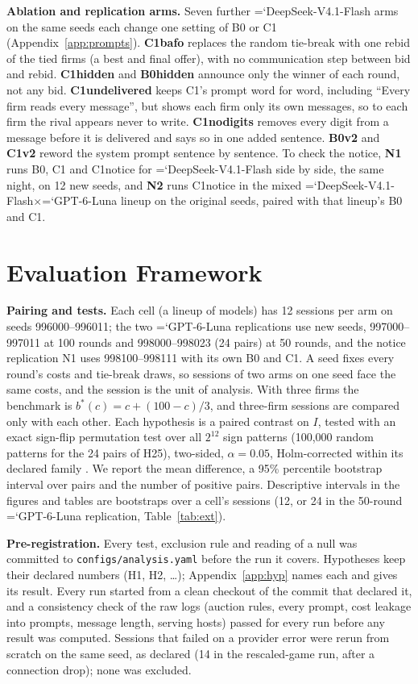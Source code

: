 \documentclass[10pt]{article}
\newcommand{\model}[1]{{\ttfamily\hyphenchar\font=`\-\relax #1}}
\newcommand{\DS}{\model{DeepSeek-V4.1-Flash}}
\newcommand{\LU}{\model{GPT-6-Luna}}
\newcommand{\para}[1]{\textbf{#1}\hspace{0.4em}}
\begin{document}
\para{Ablation and replication arms.} Seven further \DS{} arms on the same seeds each change one setting of B0 or C1 (Appendix~\ref{app:prompts}). \textbf{C1bafo} replaces the random tie-break with one rebid of the tied firms (a best and final offer), with no communication step between bid and rebid. \textbf{C1hidden} and \textbf{B0hidden} announce only the winner of each round, not any bid. \textbf{C1undelivered} keeps C1's prompt word for word, including ``Every firm reads every message'', but shows each firm only its own messages, so to each firm the rival appears never to write. \textbf{C1nodigits} removes every digit from a message before it is delivered and says so in one added sentence. \textbf{B0v2} and \textbf{C1v2} reword the system prompt sentence by sentence. To check the notice, \textbf{N1} runs B0, C1 and C1notice for \DS{} side by side, the same night, on 12 new seeds, and \textbf{N2} runs C1notice in the mixed \DS$\times$\LU{} lineup on the original seeds, paired with that lineup's B0 and C1.

\section{Evaluation Framework}

\para{Pairing and tests.} Each cell (a lineup of models) has 12 sessions per arm on seeds 996000--996011; the two \LU{} replications use new seeds, 997000--997011 at 100 rounds and 998000--998023 (24 pairs) at 50 rounds, and the notice replication N1 uses 998100--998111 with its own B0 and C1. A seed fixes every round's costs and tie-break draws, so sessions of two arms on one seed face the same costs, and the session is the unit of analysis. With three firms the benchmark is $b^*(c) = c + (100 - c)/3$, and three-firm sessions are compared only with each other. Each hypothesis is a paired contrast on $I$, tested with an exact sign-flip permutation test \citep{good2000} over all $2^{12}$ sign patterns (100{,}000 random patterns for the 24 pairs of H25), two-sided, $\alpha = 0.05$, Holm-corrected within its declared family \citep{holm1979}. We report the mean difference, a 95\% percentile bootstrap interval over pairs \citep[10{,}000 resamples;][]{efron1993} and the number of positive pairs. Descriptive intervals in the figures and tables are bootstraps over a cell's sessions (12, or 24 in the 50-round \LU{} replication, Table~\ref{tab:ext}).

\para{Pre-registration.} Every test, exclusion rule and reading of a null was committed to \texttt{configs/analysis.yaml} before the run it covers. Hypotheses keep their declared numbers (H1, H2, \dots); Appendix~\ref{app:hyp} names each and gives its result. Every run started from a clean checkout of the commit that declared it, and a consistency check of the raw logs (auction rules, every prompt, cost leakage into prompts, message length, serving hosts) passed for every run before any result was computed. Sessions that failed on a provider error were rerun from scratch on the same seed, as declared (14 in the rescaled-game run, after a connection drop); none was excluded.
\end{document}
